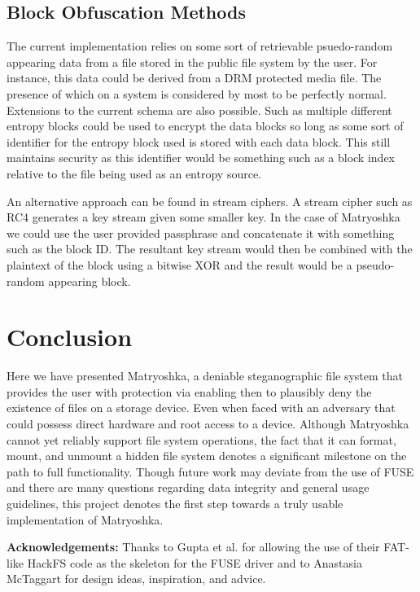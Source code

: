 \documentclass{article}
\begin{document}
\begin{multicols}{2}
\subsection{Block Obfuscation Methods}

The current implementation relies on some sort of retrievable psuedo-random appearing data from a file stored in the public file system by the user. For instance, this data could be derived from a DRM protected media file. The presence of which on a system is considered by most to be perfectly normal. Extensions to the current schema are also possible. Such as multiple different entropy blocks could be used to encrypt the data blocks so long as some sort of identifier for the entropy block used is stored with each data block. This still maintains security as this identifier would be something such as a block index relative to the file being used as an entropy source.

An alternative approach can be found in stream ciphers. A stream cipher such as RC4 generates a key stream given some smaller key. In the case of Matryoshka we  could use the user provided passphrase and concatenate it with something such as the block ID. The resultant key stream would then be combined with the plaintext of the block using a bitwise XOR and the result would be a pseudo-random appearing block. 

\section{Conclusion}

Here we have presented Matryoshka, a deniable steganographic file system that provides the user with protection via enabling then to plausibly deny the existence of files on a storage device. Even when faced with an adversary that could possess direct hardware and root access to a device. Although Matryoshka cannot yet reliably support file system operations, the fact that it can format, mount, and unmount a hidden file system denotes a significant milestone on the path to full functionality. Though future work may deviate from the use of FUSE and there are many questions regarding data integrity and general usage guidelines, this project denotes the first step towards a truly usable implementation of Matryoshka.
 
\textbf{Acknowledgements:} Thanks to Gupta et al. for allowing the use of their FAT-like HackFS code as the skeleton for the FUSE driver and to Anastasia McTaggart for design ideas, inspiration, and advice.




\end{multicols}
\end{document}
